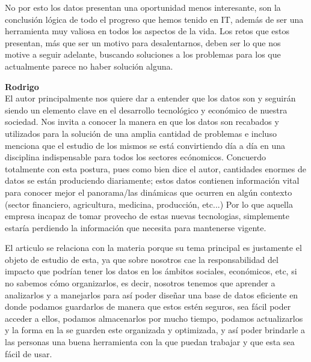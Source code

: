 \documentclass[12pt,a4paper]{article}
\begin{document}
\begin{enumerate}
\begin{enumerate}
				No por esto los datos presentan una oportunidad menos interesante,
				son la conclusión lógica de todo el progreso que hemos tenido en
				IT, además de ser una herramienta muy valiosa en todos los aspectos
				de la vida. Los retos que estos presentan, más que ser un motivo
				para desalentarnos, deben ser lo que nos motive a seguir adelante,
				buscando soluciones a los problemas para los que actualmente parece
				no haber solución alguna.
				
				\textbf{Rodrigo}\\	
                      		El autor principalmente nos quiere dar a entender que los datos son 
				y seguirán siendo un elemento clave en el desarrollo tecnológico y
				económico de nuestra sociedad. Nos invita a conocer la manera en que 
				los datos son recabados y utilizados para la solución de una amplia 
				cantidad de problemas e incluso menciona que el estudio de los mismos 
				se está convirtiendo día a día en una disciplina indispensable para 
				todos los sectores ecónomicos. Concuerdo totalmente con esta postura, 
				pues como bien dice el autor, cantidades enormes de datos se están 
				produciendo diariamente; estos datos contienen información vital para 
				conocer mejor el panorama/las dinámicas que ocurren en algún contexto 
				(sector financiero, agricultura, medicina, producción, etc...) Por lo 
				que aquella empresa incapaz de tomar provecho de estas nuevas tecnologias, 
				simplemente estaría perdiendo la información que necesita para mantenerse 
				vigente.

				El articulo se relaciona con la materia porque su tema principal es 
				justamente el objeto de estudio de esta, ya que sobre nosotros 
				cae la responsabilidad del impacto que podrían tener los datos en los 
				ámbitos sociales, económicos, etc, si no sabemos cómo organizarlos, es decir,
				nosotros tenemos que aprender a analizarlos y a manejarlos para así poder 
				diseñar una base de datos eficiente en donde podamos guardarlos de manera que 
				estos estén seguros, sea fácil poder acceder a ellos, podamos almacenarlos por 
				mucho tiempo, podamos actualizarlos y la forma en la se guarden este organizada 
				y optimizada, y así poder brindarle a las personas una buena herramienta con la 
				que puedan trabajar y que esta sea fácil de usar.
				

\end{enumerate}
\end{enumerate}
\end{document}
